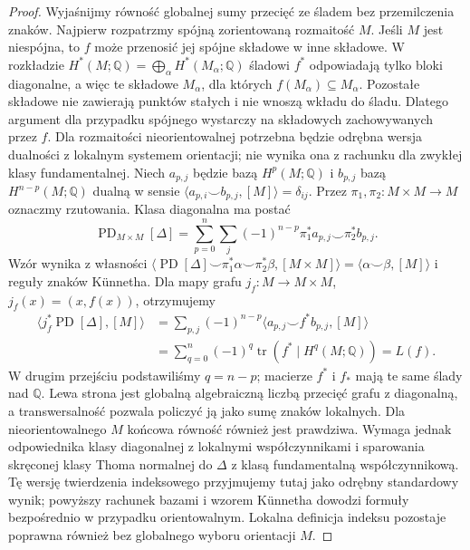 \documentclass[11pt,a4paper,oneside]{report}
\newcommand{\Q}{\mathbb{Q}}
\theoremstyle{plain}
\theoremstyle{definition}
\theoremstyle{remark}
\begin{document}
\begin{proof}
Wyjaśnijmy równość globalnej sumy przecięć ze śladem
bez przemilczenia znaków. Najpierw rozpatrzmy spójną zorientowaną rozmaitość $M$.
Jeśli $M$ jest niespójna, to $f$ może przenosić jej spójne
składowe w inne składowe. W rozkładzie
$H^*(M;\Q)=\bigoplus_{\alpha}H^*(M_\alpha;\Q)$
śladowi $f^*$ odpowiadają tylko bloki diagonalne, a więc
te składowe $M_\alpha$, dla których $f(M_\alpha)\subseteq M_\alpha$.
Pozostałe składowe nie zawierają punktów stałych i nie
wnoszą wkładu do śladu. Dlatego argument dla przypadku
spójnego wystarczy na składowych zachowywanych przez $f$.
Dla rozmaitości nieorientowalnej potrzebna będzie odrębna
wersja dualności z lokalnym systemem orientacji;
nie wynika ona z rachunku dla zwykłej klasy fundamentalnej.
Niech $a_{p,j}$ będzie bazą $H^p(M;\Q)$ i $b_{p,j}$
bazą $H^{n-p}(M;\Q)$ dualną w sensie
$\langle a_{p,i}\smile b_{p,j},[M]\rangle=\delta_{ij}$.
Przez $\pi_1,\pi_2:M\times M\to M$ oznaczmy rzutowania.
Klasa diagonalna ma postać
\[
 \operatorname{PD}_{M\times M}[\Delta]
 =\sum_{p=0}^{n}\sum_j(-1)^{n-p}
 \pi_1^*a_{p,j}\smile\pi_2^*b_{p,j}.
\]
Wzór wynika z własności
$\langle\operatorname{PD}[\Delta]\smile
 \pi_1^*\alpha\smile\pi_2^*\beta,[M\times M]\rangle
 =\langle\alpha\smile\beta,[M]\rangle$
i reguły znaków Künnetha.
Dla mapy grafu $j_f:M\to M\times M$,
$j_f(x)=(x,f(x))$, otrzymujemy
\begin{align*}
 \langle j_f^*\operatorname{PD}[\Delta],[M]\rangle
 &=\sum_{p,j}(-1)^{n-p}
 \langle a_{p,j}\smile f^*b_{p,j},[M]\rangle\\
 &=\sum_{q=0}^n(-1)^q
 \operatorname{tr}(f^*\mid H^q(M;\Q))=L(f).
\end{align*}
W drugim przejściu podstawiliśmy $q=n-p$;
macierze $f^*$ i $f_*$ mają te same ślady nad $\Q$.
Lewa strona jest globalną algebraiczną liczbą
przecięć grafu z diagonalną, a transwersalność
pozwala policzyć ją jako sumę znaków lokalnych.
Dla nieorientowalnego $M$ końcowa równość również jest
prawdziwa. Wymaga jednak odpowiednika klasy diagonalnej
z lokalnymi współczynnikami i sparowania skręconej
klasy Thoma normalnej do $\Delta$ z klasą fundamentalną
współczynnikową. Tę wersję twierdzenia indeksowego
przyjmujemy tutaj jako odrębny standardowy wynik;
powyższy rachunek bazami i wzorem Künnetha dowodzi
formuły bezpośrednio w przypadku orientowalnym.
Lokalna definicja indeksu pozostaje poprawna również
bez globalnego wyboru orientacji $M$.
\end{proof}
\end{document}
